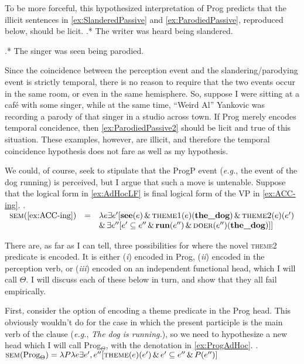\documentclass[MilwayThesis]{subfiles}
\begin{document}
To be more forceful, this hypothesized interpretation of Prog predicts that the illicit sentences in \cref{ex:SlanderedPassive} and \cref{ex:ParodiedPassive}, reproduced below, should be licit.
\ex.* The writer was heard being slandered.\label{ex:SlanderedPassive22}

\ex.* The singer was seen being parodied.\label{ex:ParodiedPassive2}

Since the coincidence between the perception event and the slandering/parodying event is strictly temporal, there is no reason to require that the two events occur in the same room, or even in the same hemisphere.
So, suppose I were sitting at a caf\'e with some singer, while at the same time, ``Weird Al'' Yankovic was recording a parody of that singer in a studio across town.
If Prog merely encodes temporal concidence, then \cref{ex:ParodiedPassive2} should be licit and true of this situation.
These examples, however, are illicit, and therefore the temporal coincidence hypothesis does not fare as well as my hypothesis.

We could, of course, seek to stipulate that the ProgP event (\textit{e.g.}, the event of the dog running) is perceived, but I argue that such a move is untenable.
Suppose that the logical form in \cref{ex:AdHocLF} is final logical form of the VP in \cref{ex:ACC-ing}.
\ex.\label{ex:AdHocLF}
$
\begin{array}[t]{rcl}
	\textsc{sem}(\text{\cref{ex:ACC-ing}}) & = & \lambda e \exists e^{\prime} [ \textbf{see}(e) \,\&\, \textsc{theme1}(e)(\textbf{the\_dog}) \,\&\, \textsc{theme2}(e)(e^{\prime})\\
	& & \&\, \exists e^{\prime\prime}[ e^{\prime} \subseteq e^{\prime\prime} \,\&\, \textbf{run}(e^{\prime\prime}) \,\&\, \textsc{doer}(e^{\prime\prime})(\textbf{the\_dog})]]
\end{array}
$

There are, as far as I can tell, three possibilities for where the novel \textsc{theme2} predicate is encoded.
It is either (\textit{i}) encoded in Prog, (\textit{ii}) encoded in the perception verb, or (\textit{iii}) encoded on an independent functional head, which I will call $\Theta$.
I will discuss each of these below in turn, and show that they all fail empirically.

First, consider the option of encoding a theme predicate in the Prog head.
This obviously wouldn't do for the case in which the present participle is the main verb of the clause (\textit{e.g.}, \textit{The dog is running.}), so we need to hypothesize a new head which I will call Prog$_{\Theta}$, with the denotation in \cref{ex:ProgAdHoc}.
\ex.\label{ex:ProgAdHoc} $\textsc{sem}(\text{Prog}_{\Theta}) = \lambda P \lambda e \exists e^{\prime},e^{\prime\prime}[\textsc{theme}(e)(e^{\prime}) \,\&\, e^{\prime}\subseteq e^{\prime\prime} \,\&\, P(e^{\prime\prime})]$
\end{document}
